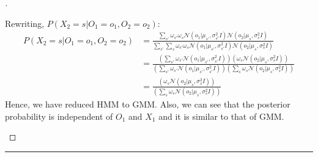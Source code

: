 \documentclass[a4paper, 12pt]{article}
\begin{document}
\begin{proof}[]
\begin{enumerate}[label={\color{blue}{\textbf{2.\arabic*})}}]
     Rewriting, $P(X_2=s| O_1=o_1,O_2=o_2)$:
     \begin{align*}
         P(X_2=s| O_1=o_1,O_2=o_2) &= \frac{\sum\nolimits_{s'}\omega_{s'}\omega_{s}\mathcal{N}(o_1 | \mu_{s'},\sigma^2_{s'}I)\mathcal{N}(o_2 | \mu_{s},\sigma^2_{s}I)}{\sum\nolimits_{s'}\sum\nolimits_{s}\omega_{s'}\omega_{s}\mathcal{N}(o_1 | \mu_{s'},\sigma^2_{s'}I)\mathcal{N}(o_2 | \mu_{s},\sigma^2_{s}I)}\\
         &= \frac{(\sum\nolimits_{s'}\omega_{s'}\mathcal{N}(o_1 | \mu_{s'},\sigma^2_{s'}I))(\omega_{s}\mathcal{N}(o_2 | \mu_{s},\sigma^2_{s}I))}{(\sum\nolimits_{s'}\omega_{s'}\mathcal{N}(o_1 | \mu_{s'},\sigma^2_{s'}I))(\sum\nolimits_{s}\omega_{s}\mathcal{N}(o_2 | \mu_{s},\sigma^2_{s}I))}\\
         &= \frac{(\omega_{s}\mathcal{N}(o_2 | \mu_{s},\sigma^2_{s}I))}{(\sum\nolimits_{s}\omega_{s}\mathcal{N}(o_2 | \mu_{s},\sigma^2_{s}I))}
     \end{align*}
     Hence, we have reduced HMM to GMM. Also, we can see that the posterior probability is independent of $O_1$ and $X_1$ and it is similar to that of GMM.
    
\end{enumerate}
\end{proof}
\hrule
\bigskip
\end{document}
